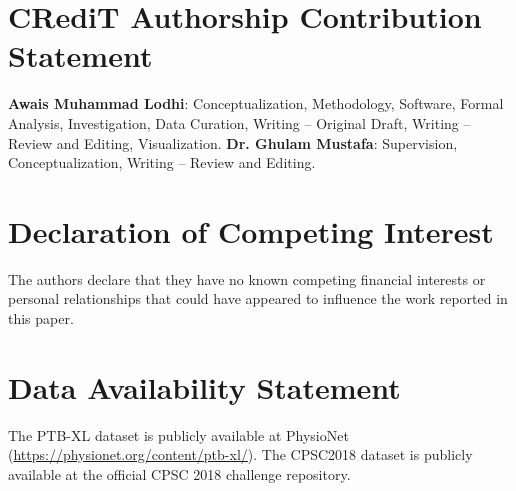 \documentclass[12pt]{elsarticle}
\begin{document}
\section*{CRediT Authorship Contribution Statement}
\textbf{Awais Muhammad Lodhi}: Conceptualization, Methodology, Software, Formal Analysis, Investigation, Data Curation, Writing -- Original Draft, Writing -- Review and Editing, Visualization.
\textbf{Dr. Ghulam Mustafa}: Supervision, Conceptualization, Writing -- Review and Editing.

\section*{Declaration of Competing Interest}
The authors declare that they have no known competing financial interests or personal relationships that could have appeared to influence the work reported in this paper.

\section*{Data Availability Statement}
The PTB-XL dataset is publicly available at PhysioNet (\url{https://physionet.org/content/ptb-xl/}). The CPSC2018 dataset is publicly available at the official CPSC 2018 challenge repository.



\end{document}
